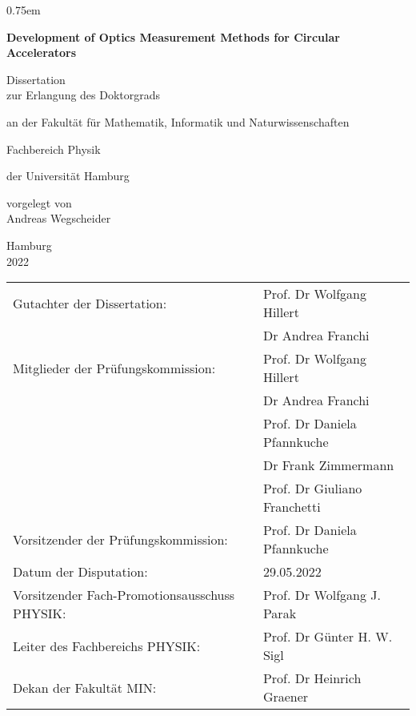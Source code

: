 \thispagestyle{empty}
\vspace{5cm}
\parskip0.75em
\begin{center}
    \Huge\bfseries
    Development of Optics Measurement Methods for Circular Accelerators

    \vspace{3cm}
    \mdseries\Large
    Dissertation\\
    \vspace{1em}
    zur Erlangung des Doktorgrads

    an der Fakult\"at f\"ur Mathematik, Informatik und Naturwissenschaften
    
    Fachbereich Physik
    
    \vspace{1em}
    der Universit\"at Hamburg

    \vspace{2cm}
    \vfill
    vorgelegt von\\
    Andreas Wegscheider
    \vspace{2em}

    Hamburg\\
    2022
\end{center}
\cleardoublepage
{}

\thispagestyle{empty}
\renewcommand\baselinestretch{1.5}\selectfont
\begin{tabular}{ll}
   Gutachter der Dissertation:%
   & Prof. Dr Wolfgang Hillert\\
   & Dr Andrea Franchi \vspace{1em} \\ 
   Mitglieder der Prüfungskommission:%
   & Prof. Dr Wolfgang Hillert\\
   & Dr Andrea Franchi\\
   & Prof. Dr Daniela Pfannkuche \\
   & Dr Frank Zimmermann\\
   & Prof. Dr Giuliano Franchetti \vspace{1.0em}  \\
   Vorsitzender der Prüfungskommission: & Prof. Dr Daniela Pfannkuche \vspace{1.0em}  \\
   Datum der Disputation: & 29.05.2022 \vspace{1.0em} \\
   Vorsitzender Fach-Promotionsausschuss PHYSIK: & Prof. Dr Wolfgang J. Parak \vspace{0.5em}  \\
   Leiter des Fachbereichs PHYSIK: & Prof. Dr Günter H. W. Sigl \vspace{0.5em}  \\
   Dekan der Fakultät MIN: & Prof. Dr Heinrich Graener
\end{tabular}

